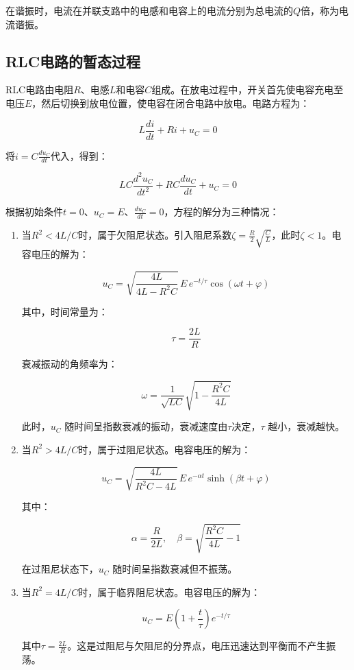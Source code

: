 \documentclass[a4paper,10pt]{article}
\begin{document}
在谐振时，电流在并联支路中的电感和电容上的电流分别为总电流的\( Q \)倍，称为电流谐振。

\subsection{RLC电路的暂态过程}

RLC电路由电阻\( R \)、电感\( L \)和电容\( C \)组成。在放电过程中，开关首先使电容充电至电压\( E \)，然后切换到放电位置，使电容在闭合电路中放电。电路方程为：

\[
L \frac{di}{dt} + Ri + u_C = 0
\]

将\( i = C \frac{du_C}{dt} \)代入，得到：

\[
LC \frac{d^2u_C}{dt^2} + RC \frac{du_C}{dt} + u_C = 0
\]

根据初始条件\( t = 0 \)、\( u_C = E \)、\( \frac{du_C}{dt} = 0 \)，方程的解分为三种情况：

\begin{enumerate}
    \item 当\( R^2 < 4L/C \)时，属于欠阻尼状态。引入阻尼系数\( \zeta = \frac{R}{2} \sqrt{\frac{C}{L}} \)，此时\( \zeta < 1 \)。电容电压的解为：

    \[
    u_C = \sqrt{\frac{4L}{4L - R^2C}} \, E \, e^{-t/\tau} \cos(\omega t + \varphi)
    \]

    其中，时间常量为：

    \[
    \tau = \frac{2L}{R}
    \]

    衰减振动的角频率为：

    \[
    \omega = \frac{1}{\sqrt{LC}} \sqrt{1 - \frac{R^2C}{4L}}
    \]

    此时，\( u_C \) 随时间呈指数衰减的振动，衰减速度由\( \tau \)决定，\( \tau \) 越小，衰减越快。

    \item 当\( R^2 > 4L/C \)时，属于过阻尼状态。电容电压的解为：

    \[
    u_C = \sqrt{\frac{4L}{R^2C - 4L}} \, E \, e^{-\alpha t} \sinh(\beta t + \varphi)
    \]

    其中：

    \[
    \alpha = \frac{R}{2L}, \quad \beta = \sqrt{\frac{R^2C}{4L} - 1}
    \]

    在过阻尼状态下，\( u_C \) 随时间呈指数衰减但不振荡。

    \item 当\( R^2 = 4L/C \)时，属于临界阻尼状态。电容电压的解为：

    \[
    u_C = E \left(1 + \frac{t}{\tau}\right) e^{-t/\tau}
    \]

    其中\( \tau = \frac{2L}{R} \)。这是过阻尼与欠阻尼的分界点，电压迅速达到平衡而不产生振荡。
\end{enumerate}
\end{document}

